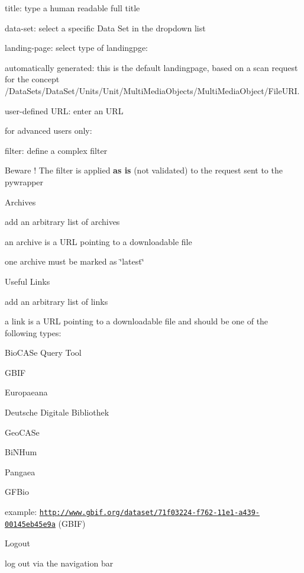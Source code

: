 \begin{DoxyEnumerate}
\begin{DoxyItemize}
\begin{DoxyItemize}
\item title\+: type a human readable full title
\item data-\/set\+: select a specific Data Set in the dropdown list
\item landing-\/page\+: select type of landingpge\+:
\begin{DoxyItemize}
\item automatically generated\+: this is the default landingpage, based on a scan request for the concept {\ttfamily /\+Data\+Sets/\+Data\+Set/\+Units/\+Unit/\+Multi\+Media\+Objects/\+Multi\+Media\+Object/\+File\+U\+RI}.
\item user-\/defined U\+RL\+: enter an U\+RL
\end{DoxyItemize}
\item for advanced users only\+:
\begin{DoxyItemize}
\item filter\+: define a complex filter
\item Beware ! The filter is applied {\bfseries as is} (not validated) to the request sent to the pywrapper
\end{DoxyItemize}
\end{DoxyItemize}
\item Archives
\begin{DoxyItemize}
\item add an arbitrary list of archives
\item an archive is a U\+RL pointing to a downloadable file
\item one archive must be marked as \char`\"{}latest\char`\"{}
\end{DoxyItemize}
\item Useful Links
\begin{DoxyItemize}
\item add an arbitrary list of links
\item a link is a U\+RL pointing to a downloadable file and should be one of the following types\+:
\begin{DoxyItemize}
\item Bio\+C\+A\+Se Query Tool
\item G\+B\+IF
\item Europaeana
\item Deutsche Digitale Bibliothek
\item Geo\+C\+A\+Se
\item Bi\+N\+Hum
\item Pangaea
\item G\+F\+Bio
\end{DoxyItemize}
\item example\+: {\ttfamily \href{http://www.gbif.org/dataset/71f03224-f762-11e1-a439-00145eb45e9a}{\tt http\+://www.\+gbif.\+org/dataset/71f03224-\/f762-\/11e1-\/a439-\/00145eb45e9a}} (G\+B\+IF)
\end{DoxyItemize}
\end{DoxyItemize}
\item Logout
\begin{DoxyItemize}
\item log out via the navigation bar
\end{DoxyItemize}
\end{DoxyEnumerate}
